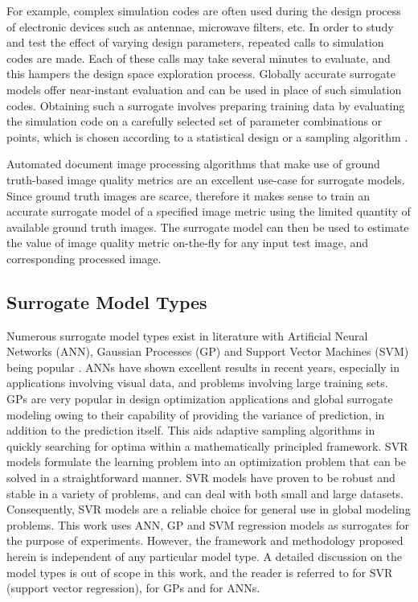 \documentclass[10pt, a4paper, conference, compsocconf]{IEEEtran}
\begin{document}
For example, complex simulation codes are often used during the design process of electronic devices such as antennae, microwave filters, etc. In order to study and test the effect of varying design parameters, repeated calls to simulation codes are made. Each of these calls may take several minutes to evaluate, and this hampers the design space exploration process. Globally accurate surrogate models offer near-instant evaluation and can be used in place of such simulation codes. Obtaining such a surrogate involves preparing training data by evaluating the simulation code on a carefully selected set of parameter combinations or points, which is chosen according to a statistical design or a sampling algorithm \cite{gorissen2010surrogate}.

Automated document image processing algorithms that make use of ground truth-based image quality metrics are an excellent use-case for surrogate models. Since ground truth images are scarce, therefore it makes sense to train an accurate surrogate model of a specified image metric using the limited quantity of available ground truth images. The surrogate model can then be used to estimate the value of image quality metric on-the-fly for any input test image, and corresponding processed image.

\subsection{Surrogate Model Types}
Numerous surrogate model types exist in literature with Artificial Neural Networks (ANN), Gaussian Processes (GP) and Support Vector Machines (SVM) being popular \cite{singh2016shape}. ANNs \cite{haykin2009neural} have shown excellent results in recent years, especially in applications involving visual data, and problems involving large training sets. GPs \cite{rasmussen2006gaussian} are very popular in design optimization applications and global surrogate modeling owing to their capability of providing the variance of prediction, in addition to the prediction itself. This aids adaptive sampling algorithms in quickly searching for optima within a mathematically principled framework. 
SVR models \cite{cortes1995support} formulate the learning problem into an optimization problem that can be solved in a straightforward manner. SVR models have proven to be robust and stable in a variety of problems, and can deal with both small and large datasets. Consequently, SVR models are a reliable choice for general use in global modeling problems. This work uses ANN, GP and SVM regression models as surrogates for the purpose of experiments. However, the framework and methodology proposed herein is independent of any particular model type. A detailed discussion on the model types is out of scope in this work, and the reader is referred to \cite{smola2004tutorial,basak2007support} for SVR (support vector regression), \cite{rasmussen2006gaussian} for GPs and \cite{haykin2009neural} for ANNs.
\end{document}
